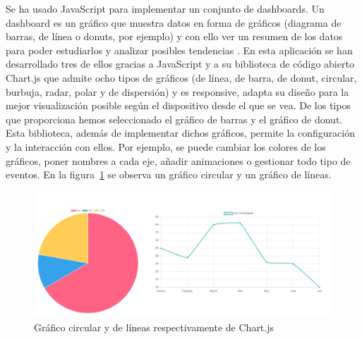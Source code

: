 \documentclass[a4paper, 12pt]{book}
\begin{document}
\begin{enumerate}[a)]
       Se ha usado JavaScript para implementar un conjunto de dashboards. Un dashboard es un gráfico que muestra datos en forma de gráficos (diagrama de barras, de línea o donuts, por ejemplo) y con ello ver un resumen de los datos para poder estudiarlos y analizar posibles tendencias . En esta aplicación se han desarrollado tres de ellos gracias a JavaScript y a su biblioteca de código abierto Chart.js que admite ocho tipos de gráficos (de línea, de barra, de donut, circular, burbuja, radar, polar y de dispersión) y es responsive, adapta su diseño para la mejor visualización posible según el dispositivo desde el que se vea. De los tipos que proporciona hemos seleccionado el gráfico de barras y el gráfico de donut. Esta biblioteca, además de implementar dichos gráficos, permite la configuración y la interacción con ellos. Por ejemplo, se puede cambiar los colores de los gráficos, poner nombres a cada eje, añadir animaciones o gestionar todo tipo de eventos. En la figura~\ref{figura:js} se observa un gráfico circular y un gráfico de líneas. 
    \begin{figure}[h]
            \centering
            \includegraphics[scale=0.5]{img/chart.PNG}
            \caption{Gráfico circular y de líneas respectivamente de Chart.js}
            \label{figura:js}
        \end{figure}
    
       
\end{enumerate}
\end{document}

